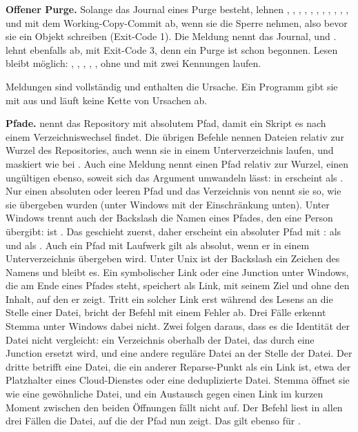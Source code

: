 {\bf Offener Purge.} Solange das Journal  eines Purge besteht,
lehnen , , , , , ,
, , , , ,
 und  mit
dem Working-Copy-Commit ab, wenn sie die Sperre nehmen,
also bevor sie ein Objekt schreiben (Exit-Code 1). Die Meldung
nennt das Journal,  und .
 lehnt ebenfalls ab, mit Exit-Code 3, denn ein Purge ist schon begonnen.
Lesen bleibt möglich: , , ,
, ,
 ohne  und  mit zwei Kennungen laufen.

Meldungen sind vollständig und enthalten die Ursache. Ein Programm gibt sie mit
 aus und läuft keine Kette von Ursachen ab.

{\bf Pfade.}  nennt das Repository mit absolutem Pfad, damit ein Skript es nach
einem Verzeichniswechsel findet. Die übrigen Befehle nennen Dateien relativ zur Wurzel des
Repositories, auch wenn sie in einem Unterverzeichnis laufen, und maskiert wie bei
. Auch eine Meldung nennt einen Pfad relativ zur Wurzel, einen ungültigen ebenso,
soweit sich das Argument umwandeln lässt:  in  erscheint als
. Nur einen absoluten oder leeren Pfad und das Verzeichnis von 
nennt sie so, wie sie übergeben wurden (unter Windows mit der Einschränkung unten).
Unter Windows trennt auch der Backslash die Namen eines Pfades, den eine Person übergibt:
 ist .
Das geschieht zuerst, daher erscheint ein absoluter Pfad mit \type{/}:
\type{\x} als  und  als .
Auch ein Pfad mit Laufwerk gilt als absolut, wenn er in einem Unterverzeichnis übergeben wird.
Unter Unix ist der Backslash ein Zeichen des Namens und bleibt es.
Ein symbolischer Link oder eine Junction unter Windows, die am Ende eines Pfades steht,
speichert  als Link, mit seinem Ziel und ohne den Inhalt, auf den er zeigt.
Tritt ein solcher Link erst während des Lesens an die Stelle einer Datei,
bricht der Befehl mit einem Fehler ab.
Drei Fälle erkennt Stemma unter Windows dabei nicht.
Zwei folgen daraus, dass es die Identität der Datei nicht vergleicht:
ein Verzeichnis oberhalb der Datei, das durch eine Junction ersetzt wird, und
eine andere reguläre Datei an der Stelle der Datei.
Der dritte betrifft eine Datei, die ein anderer Reparse-Punkt als ein Link ist,
etwa der Platzhalter eines Cloud-Dienstes oder eine deduplizierte Datei.
Stemma öffnet sie wie eine gewöhnliche Datei, und ein Austausch gegen einen Link
im kurzen Moment zwischen den beiden Öffnungen fällt nicht auf.
Der Befehl liest in allen drei Fällen die Datei, auf die der Pfad nun zeigt.
Das gilt ebenso für .

